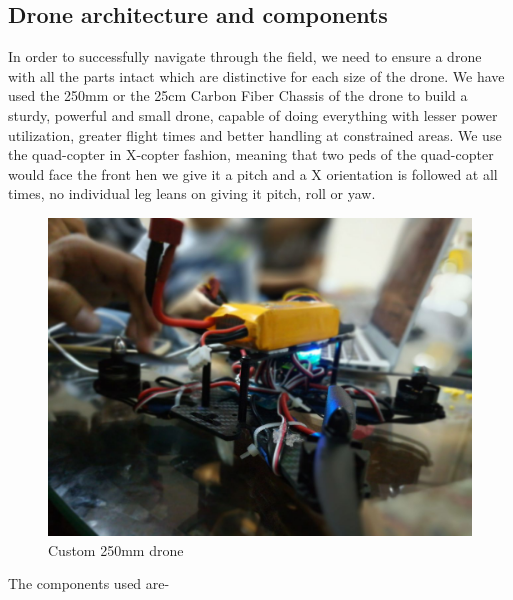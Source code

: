 \subsection{Drone architecture and components}
In order to successfully navigate through the field, we need to ensure a drone with all the parts intact which are distinctive for each size of the drone. We have used the 250mm or the 25cm Carbon Fiber Chassis of the drone to build a sturdy, powerful and small drone, capable of doing everything with lesser power utilization, greater flight times and better handling at constrained areas. We use the quad-copter in X-copter fashion, meaning that two peds of the quad-copter would face the front hen we give it a pitch and a X orientation is followed at all times, no individual leg leans on giving it pitch, roll or yaw. 
\begin{figure}[H]
    \centering
    \includegraphics[width=0.8\linewidth]{SummerInterReport/project/Images-Major/drone.jpeg}
    \caption{Custom 250mm drone}
    \label{fig:drone}
\end{figure}
The components used are-
\\
